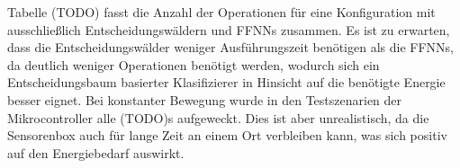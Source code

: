\newline
\newline
Tabelle (TODO) fasst die Anzahl der Operationen für eine Konfiguration mit ausschließlich Entscheidungswäldern und FFNNs zusammen.
Es ist zu erwarten, dass die Entscheidungswälder weniger Ausführungszeit benötigen als die FFNNs, da deutlich weniger Operationen benötigt werden,
wodurch sich ein Entscheidungsbaum basierter Klasifizierer in Hinsicht auf die benötigte Energie besser eignet.
Bei konstanter Bewegung wurde in den Testszenarien der Mikrocontroller alle (TODO)s aufgeweckt.
Dies ist aber unrealistisch, da die Sensorenbox auch für lange Zeit an einem Ort verbleiben kann, was sich positiv auf den Energiebedarf auswirkt.